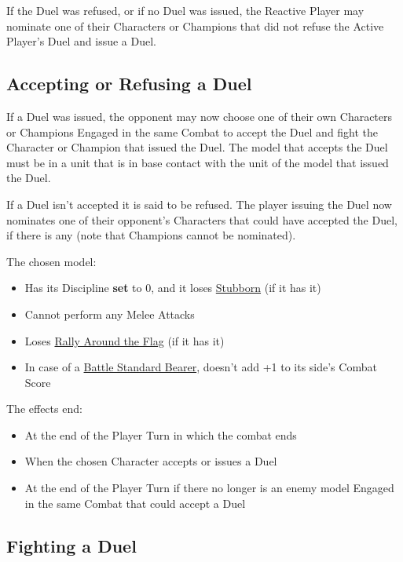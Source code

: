 If the Duel was refused, or if no Duel was issued, the Reactive Player may nominate one of their Characters or Champions that did not refuse the Active Player's Duel and issue a Duel.

\subsection{Accepting or Refusing a Duel}
\label{accepting_and_refusing_a_duel}

If a Duel was issued, the opponent may now choose one of their own Characters or Champions Engaged in the same Combat to accept the Duel and fight the Character or Champion that issued the Duel. The model that accepts the Duel must be in a unit that is in base contact with the unit of the model that issued the Duel.

If a Duel isn't accepted it is said to be refused. The player issuing the Duel now nominates one of their opponent's Characters that could have accepted the Duel, if there is any (note that Champions cannot be nominated).

The chosen model:
\begin{itemize}
\item Has its Discipline \textbf{set} to 0, and it loses \hyperref[stubborn]{Stubborn} (if it has it)
\item Cannot perform any Melee Attacks
\item Loses \hyperref[rally_around_the_flag]{Rally Around the Flag} (if it has it)
\item In case of a \hyperref[bsb]{Battle Standard Bearer}, doesn't add +1 to its side's Combat Score
\end{itemize}

The effects end:
\begin{itemize}
\item At the end of the Player Turn in which the combat ends
\item When the chosen Character accepts or issues a Duel
\item At the end of the Player Turn if there no longer is an enemy model Engaged in the same Combat that could accept a Duel
\end{itemize}

\subsection{Fighting a Duel}
\label{fighting_a_duel}

